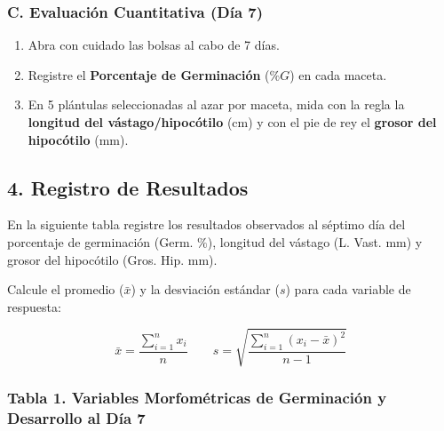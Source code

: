 \documentclass[
  spanish,
  10pt,
  letterpaper,
  twocolumn]{article}
\providecommand{\tightlist}{%
  \setlength{\itemsep}{0pt}\setlength{\parskip}{0pt}}
\begin{document}
\subsubsection{C. Evaluación Cuantitativa (Día
7)}\label{c.-evaluaciuxf3n-cuantitativa-duxeda-7}

\begin{enumerate}
\def\labelenumi{\arabic{enumi}.}
\tightlist
\item
  Abra con cuidado las bolsas al cabo de 7 días.
\item
  Registre el \textbf{Porcentaje de Germinación} (\(\%G\)) en cada
  maceta.
\item
  En 5 plántulas seleccionadas al azar por maceta, mida con la regla la
  \textbf{longitud del vástago/hipocótilo} (\(\text{cm}\)) y con el pie
  de rey el \textbf{grosor del hipocótilo} (\(\text{mm}\)).
\end{enumerate}

\subsection{4. Registro de Resultados}\label{registro-de-resultados}

En la siguiente tabla registre los resultados observados al séptimo día
del porcentaje de germinación (Germ. \(\%\)), longitud del vástago (L.
Vast. mm) y grosor del hipocótilo (Gros. Hip. mm).

Calcule el promedio (\(\bar{x}\)) y la desviación estándar (\(s\)) para
cada variable de respuesta:

\[\bar{x} = \frac{\sum_{i=1}^{n} x_i}{n} \qquad s = \sqrt{\frac{\sum_{i=1}^{n} (x_i - \bar{x})^2}{n - 1}}\]

\subsubsection{Tabla 1. Variables Morfométricas de Germinación y
Desarrollo al Día
7}\label{tabla-1.-variables-morfomuxe9tricas-de-germinaciuxf3n-y-desarrollo-al-duxeda-7}
\end{document}
